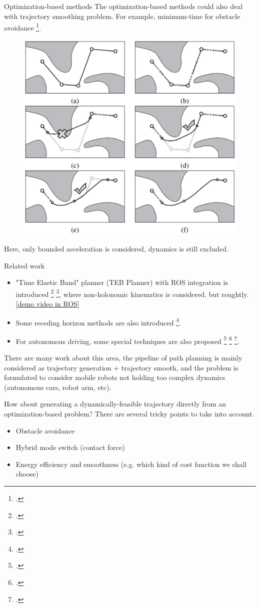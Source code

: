 \documentclass{beamer}
\begin{document}
\begin{frame}{Optimization-based methods}
	The optimization-based methods could also deal with trajectory smoothing problem. For example, minimum-time for obstacle avoidance \footcite{hauser2010fast}.
	\begin{figure}
		\includegraphics[width=0.4\linewidth]{figures/trajectory-smooth-optimal-bounded-acceleration.png}
	\end{figure}
	Here, only bounded acceleration is considered, dynamics is still excluded.
\end{frame}

\begin{frame}{Related work}
	\begin{itemize}
		\item "Time Elastic Band" planner (TEB Planner) with ROS integration is introduced \footcite{rosmann2012trajectory} \footcite{rosmann2013efficient}, where non-holonomic kinematics is considered, but roughtly. \href{https://www.youtube.com/watch?v=e1Bw6JOgHME&feature=emb_title}{[demo video in ROS]}
		\item Some receding horizon methods are also introduced \footcite{kogan2006optimization}.
		\item For autonomous driving, some special techniques are also proposed \footcite{dolgov2010path} \footcite{ziegler2014trajectory} \footcite{gu2012road}.
	\end{itemize}
\end{frame}

\begin{frame}
	There are many work about this area, the pipeline of path planning is mainly considered as trajectory generation + trajectory smooth, and the problem is formulated to consider mobile robots not holding too complex dynamics (autonomous cars, robot arm, etc).
	
	\vspace{\baselineskip}
	How about generating a dynamically-feasible trajectory directly from an optimization-based problem? There are several tricky points to take into account.
	\begin{itemize}
		\item Obstacle avoidance
		\item Hybrid mode switch (contact force)
		\item Energy efficiency and smoothness (e.g. which kind of cost function we shall choose)
	\end{itemize}
\end{frame}
\end{document}
